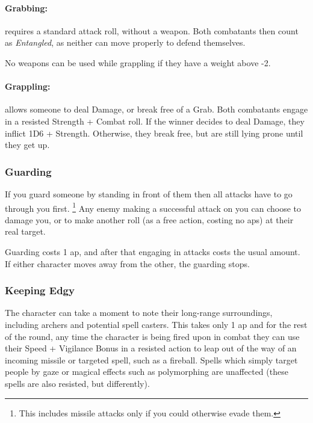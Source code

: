 \begin{multicols}{2}
\paragraph[Grabs: Make an attack without any weapon bonus. Both combatants are \textit{Entangled}. Cost: 1 \gls{ap}]{Grabbing:}
requires a standard attack roll, without a weapon.
Both combatants then count as \textit{Entangled}, as neither can move properly to defend themselves.
\label{grab}

No weapons can be used while grappling if they have a \gls{weight} above -2.

\paragraph[Grapple: Make an opposted roll of Strength + Combat.  Success means the combatant can either break free or inflict Damage.  Cost: 3 \gls{ap}]{Grappling:}
allows someone to deal Damage, or break free of a Grab.
Both combatants engage in a resisted Strength + Combat roll.
If the winner decides to deal Damage, they inflict 1D6 + Strength.
Otherwise, they break free, but are still lying prone until they get up.
\label{grapple}

\subsubsection[Guard: Someone must successfully hit you before they are allowed to hit whomever you are guarding. Cost: 1 \gls{ap}]{Guarding}

If you guard someone by standing in front of them then all attacks have to go through you first.%
\footnote{This includes missile attacks only if you could otherwise evade them.}
Any enemy making a successful attack on you can choose to damage you, or to make another roll (as a free action, costing no \glspl{ap}) at their real target.

Guarding costs 1 \gls{ap}, and after that engaging in attacks costs the usual amount.
If either character moves away from the other, the guarding stops.

\subsubsection[Keep Edgy: Look out for missiles and resist them with Speed + Vigilance. Cost: 1 \gls{ap}]{Keeping Edgy}
\label{edgy}

The character can take a moment to note their long-range surroundings, including archers and potential spell casters.
This takes only 1 \gls{ap} and for the rest of the round, any time the character is being fired upon in combat they can use their Speed + Vigilance Bonus in a resisted action to leap out of the way of an incoming missile or targeted spell, such as a fireball.
Spells which simply target people by gaze or magical effects such as polymorphing are unaffected (these spells are also resisted, but differently).


\end{multicols}
